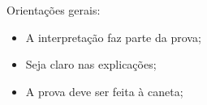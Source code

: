 \documentclass[a4paper, 12pt, addpoints]{cls/exam}
\begin{document}
\nomeDisciplina{}
\semestre{}   %
\dataDaProva{ \today }

\info

\begin{small}
\noindent Orientações gerais:
\begin{itemize}
  \itemsep=-2mm
  \item A interpretação faz parte da prova;
  \item Seja claro nas explicações;
  \item A prova deve ser feita à caneta; 
\end{itemize}
\end{small}
\hrulefill



\begin{questions}






\end{questions}
\end{document}
